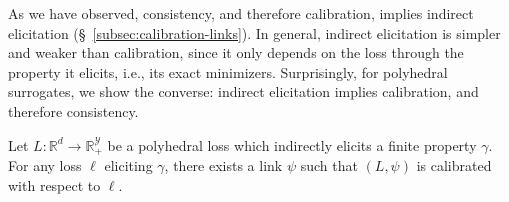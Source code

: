 \documentclass[twoside,11pt]{article}
\newcommand{\reals}{\mathbb{R}}
\newcommand{\prop}[1]{\mathrm{prop}[#1]}
\newcommand{\simplex}{\Delta_\Y}
\newcommand{\R}{\mathcal{R}}
\newcommand{\Y}{\mathcal{Y}}
\newcommand{\toto}{\rightrightarrows}
\begin{document}

%




As we have observed, consistency, and therefore calibration, implies indirect elicitation (\S~\ref{subsec:calibration-links}).
In general, indirect elicitation is simpler and weaker than calibration, since it only depends on the loss through the property it elicits, i.e., its exact minimizers.
Surprisingly, for polyhedral surrogates, we show the converse: indirect elicitation implies calibration, and therefore consistency.

\begin{theorem}\label{thm:poly-ie-implies-consistent}
	Let $L:\reals^d \to \reals^\Y_+$ be a polyhedral loss which indirectly elicits a finite property $\gamma$.
  For any loss $\ell$ eliciting $\gamma$, there exists a link $\psi$ such that $(L, \psi)$ is calibrated with respect to $\ell$.
\end{theorem}
\end{document}
